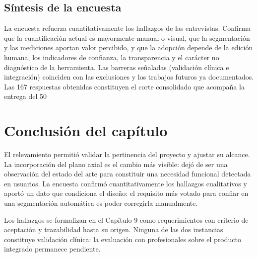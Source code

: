 \subsection{Síntesis de la encuesta}

La encuesta refuerza cuantitativamente los hallazgos de las entrevistas. Confirma que la cuantificación actual es mayormente manual o visual, que la segmentación y las mediciones aportan valor percibido, y que la adopción depende de la edición humana, los indicadores de confianza, la transparencia y el carácter no diagnóstico de la herramienta. Las barreras señaladas (validación clínica e integración) coinciden con las exclusiones y los trabajos futuros ya documentados. Las 167 respuestas obtenidas constituyen el corte consolidado que acompaña la entrega del 50 %

\section{Conclusión del capítulo}

El relevamiento permitió validar la pertinencia del proyecto y ajustar su alcance. La incorporación del plano axial es el cambio más visible: dejó de ser una observación del estado del arte para constituir una necesidad funcional detectada en usuarios. La encuesta confirmó cuantitativamente los hallazgos cualitativos y aportó un dato que condiciona el diseño: el requisito más votado para confiar en una segmentación automática es poder corregirla manualmente.

Los hallazgos se formalizan en el Capítulo 9 como requerimientos con criterio de aceptación y trazabilidad hasta su origen. Ninguna de las dos instancias constituye validación clínica: la evaluación con profesionales sobre el producto integrado permanece pendiente.
